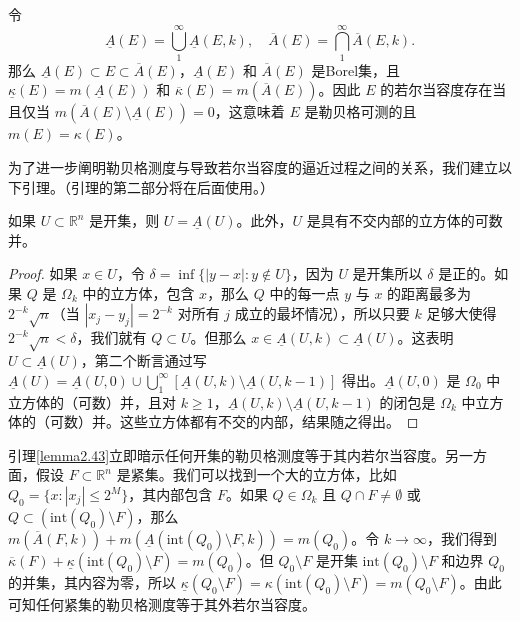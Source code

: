 \documentclass[lang=cn,10pt,thmcnt=section]{elegantbook}
\begin{document}
令
\[ \underline{A}(E) = \bigcup_1^\infty \underline{A}(E,k), \quad \overline{A}(E) = \bigcap_1^\infty \overline{A}(E,k). \]
那么 $\underline{A}(E) \subset E \subset \overline{A}(E)$，$\underline{A}(E)$ 和 $\overline{A}(E)$ 是Borel集，且 $\underline{\kappa}(E) = m(\underline{A}(E))$ 和 $\overline{\kappa}(E) = m(\overline{A}(E))$。因此 $E$ 的若尔当容度存在当且仅当 $m(\overline{A}(E) \setminus \underline{A}(E)) = 0$，这意味着 $E$ 是勒贝格可测的且 $m(E) = \kappa(E)$。

为了进一步阐明勒贝格测度与导致若尔当容度的逼近过程之间的关系，我们建立以下引理。（引理的第二部分将在后面使用。）

\begin{lemma}\label{lemma2.43}
如果 $U \subset \mathbb{R}^n$ 是开集，则 $U = \underline{A}(U)$。此外，$U$ 是具有不交内部的立方体的可数并。
\end{lemma}

\begin{proof}
如果 $x \in U$，令 $\delta = \inf\{|y-x| : y \notin U\}$，因为 $U$ 是开集所以 $\delta$ 是正的。如果 $Q$ 是 $\Omega_k$ 中的立方体，包含 $x$，那么 $Q$ 中的每一点 $y$ 与 $x$ 的距离最多为 $2^{-k}\sqrt{n}$（当 $|x_j-y_j| = 2^{-k}$ 对所有 $j$ 成立的最坏情况），所以只要 $k$ 足够大使得 $2^{-k}\sqrt{n} < \delta$，我们就有 $Q \subset U$。但那么 $x \in \underline{A}(U,k) \subset \underline{A}(U)$。这表明 $U \subset \underline{A}(U)$，第二个断言通过写 $\underline{A}(U) = \underline{A}(U,0) \cup \bigcup_1^\infty [\underline{A}(U,k) \setminus \underline{A}(U,k-1)]$ 得出。$\underline{A}(U,0)$ 是 $\Omega_0$ 中立方体的（可数）并，且对 $k \ge 1$，$\underline{A}(U,k) \setminus \underline{A}(U,k-1)$ 的闭包是 $\Omega_k$ 中立方体的（可数）并。这些立方体都有不交的内部，结果随之得出。
\end{proof}

引理\ref{lemma2.43}立即暗示任何开集的勒贝格测度等于其内若尔当容度。另一方面，假设 $F \subset \mathbb{R}^n$ 是紧集。我们可以找到一个大的立方体，比如 $Q_0 = \{x : |x_j| \le 2^M\}$，其内部包含 $F$。如果 $Q \in \Omega_k$ 且 $Q \cap F \neq \emptyset$ 或 $Q \subset (\text{int}(Q_0) \setminus F)$，那么 $m(\overline{A}(F,k)) + m(\underline{A}(\text{int}(Q_0)\setminus F,k)) = m(Q_0)$。令 $k \to \infty$，我们得到 $\overline{\kappa}(F) + \underline{\kappa}(\text{int}(Q_0) \setminus F) = m(Q_0)$。但 $Q_0 \setminus F$ 是开集 $\text{int}(Q_0) \setminus F$ 和边界 $Q_0$ 的并集，其内容为零，所以 $\underline{\kappa}(Q_0 \setminus F) = \kappa(\text{int}(Q_0) \setminus F) = m(Q_0 \setminus F)$。由此可知任何紧集的勒贝格测度等于其外若尔当容度。
\end{document}

